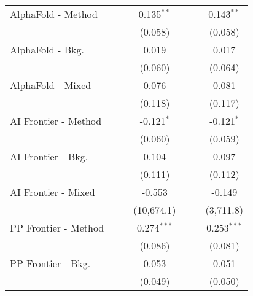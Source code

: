 \begin{tabular}{lcccccc}
   AlphaFold - Method           &                &               & 0.135$^{**}$  &                &               & 0.143$^{**}$\\   
                                &                &               & (0.058)       &                &               & (0.058)\\   
   AlphaFold - Bkg.             &                &               & 0.019         &                &               & 0.017\\   
                                &                &               & (0.060)       &                &               & (0.064)\\   
   AlphaFold - Mixed            &                &               & 0.076         &                &               & 0.081\\   
                                &                &               & (0.118)       &                &               & (0.117)\\   
   AI Frontier - Method         &                &               & -0.121$^{*}$  &                &               & -0.121$^{*}$\\   
                                &                &               & (0.060)       &                &               & (0.059)\\   
   AI Frontier - Bkg.           &                &               & 0.104         &                &               & 0.097\\   
                                &                &               & (0.111)       &                &               & (0.112)\\   
   AI Frontier - Mixed          &                &               & -0.553        &                &               & -0.149\\   
                                &                &               & (10,674.1)    &                &               & (3,711.8)\\   
   PP Frontier - Method         &                &               & 0.274$^{***}$ &                &               & 0.253$^{***}$\\   
                                &                &               & (0.086)       &                &               & (0.081)\\   
   PP Frontier - Bkg.           &                &               & 0.053         &                &               & 0.051\\   
                                &                &               & (0.049)       &                &               & (0.050)\\   

\end{tabular}
